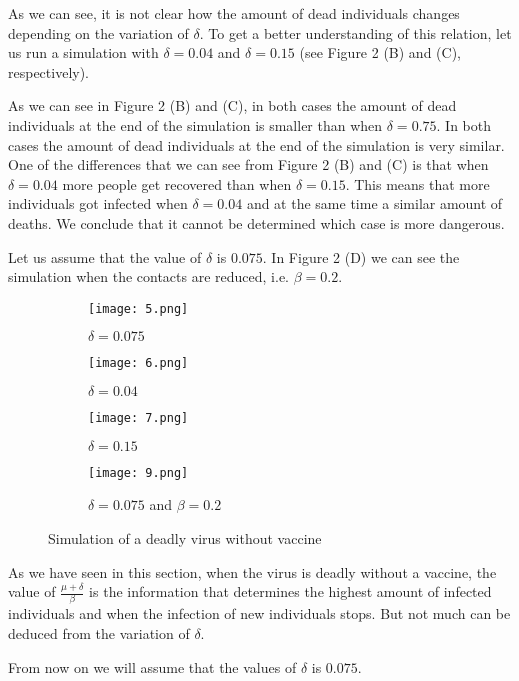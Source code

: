 \documentclass[14pt]{amsart}
\begin{document}
As we can see, it is not clear how the amount of dead individuals changes depending on the variation of $\delta$. To get a better understanding of this relation, let us run a simulation with $\delta=0.04$ and $\delta=0.15$ (see Figure 2 (B) and (C), respectively). 

As we can see in Figure 2 (B) and (C), in both cases the amount of dead individuals at the end of the simulation is smaller than when $\delta=0.75$. In both cases the amount of dead individuals at the end of the simulation is very similar. One of the differences that we can see from Figure 2 (B) and (C) is that when $\delta=0.04$ more people get recovered than when $\delta=0.15$. This means that more individuals got infected when $\delta=0.04$ and at the same time a similar amount of deaths. We conclude that it cannot be determined which case is more dangerous.

Let us assume that the value of $\delta$ is $0.075$. In Figure 2 (D) we can see the simulation when the contacts are reduced, i.e. $\beta=0.2$.

\begin{figure}[h!]
  \centering
  \begin{subfigure}[b]{0.4\linewidth}
    \texttt{[image: 5.png]}
    \caption{$\delta=0.075$}
  \end{subfigure}
  \begin{subfigure}[b]{0.4\linewidth}
    \texttt{[image: 6.png]}
    \caption{$\delta=0.04$}
  \end{subfigure}
    \begin{subfigure}[b]{0.4\linewidth}
    \texttt{[image: 7.png]}
    \caption{$\delta=0.15$}
  \end{subfigure}
    \begin{subfigure}[b]{0.4\linewidth}
    \texttt{[image: 9.png]}
    \caption{$\delta=0.075$ and $\beta=0.2$}
  \end{subfigure}
  \caption{Simulation of a deadly virus without vaccine}
\end{figure}

As we have seen in this section, when the virus is deadly without a vaccine, the value of $\frac{\mu + \delta}{\beta}$ is the information that determines the highest amount of infected individuals and when the infection of new individuals stops. But not much can be deduced from the variation of $\delta$.

From now on we will assume that the values of $\delta$ is $0.075$.
\end{document}
